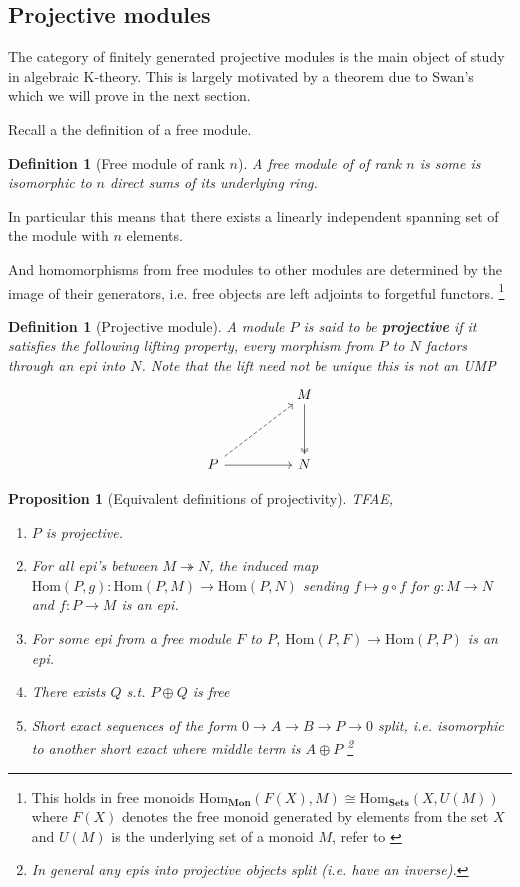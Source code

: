 \documentclass[12pt]{article}
\numberwithin{equation}{section}
\newcommand{\Hom}{{\mathrm{Hom}}}
\newcounter{dummy} \numberwithin{dummy}{section}
\newtheorem{definition}[dummy]{Definition}
\newtheorem{proposition}[dummy]{Proposition}
\begin{document}
	\subsection{Projective modules}	
	The category of finitely generated projective modules is the main object of study in algebraic K-theory. This is largely motivated by a theorem due to Swan's which we will prove in the next section.
	
	Recall a the definition of a free module.
	\begin{definition}[Free module of rank $n$]
		A free module of of rank $n$ is some is isomorphic to $n$ direct sums of its underlying ring. 
	\end{definition}In particular this means that there exists a linearly independent spanning set of the module with $n$ elements.
	
	And homomorphisms from free modules to other modules are determined by the image of their generators, i.e. free objects are left adjoints to forgetful functors. \footnote{This holds in free monoids $\mathrm{Hom}_\mathbf{Mon}(F(X), M) \cong \mathrm{Hom}_\mathbf{Sets} (X, U(M))$ where $F(X)$ denotes the free monoid generated by elements from the set $X$ and $U(M)$ is the underlying set of a monoid $M$, refer to \cite[p. ~208]{Awodey} }
	\begin{definition}[Projective module]
		A module $P$ is said to be \textbf{projective} if it satisfies the following lifting property, every morphism from $P$ to $N$ factors through an epi into $N$. Note that the lift need not be unique this is \textit{not} an UMP
		\[\begin{tikzcd}
			&& M \\
			\\
			P && N
			\arrow[two heads, from=1-3, to=3-3]
			\arrow[from=3-1, to=3-3]
			\arrow[dashed, from=3-1, to=1-3]
		\end{tikzcd}\]
	\end{definition}
	
	
	
	
	\begin{proposition}[Equivalent definitions of projectivity]\label{projtfae}
		TFAE,
		\begin{enumerate}
			\item $P$ is projective.
			\item For all epi's between $M\twoheadrightarrow N$, the induced map $\Hom(P,g):\mathrm{Hom}(P,M) \to \mathrm{Hom}(P,N)$ sending $f \mapsto g \circ f$ for $g:M \to N$ and $f:P \to M$ is an epi.
			\item For some epi from a free module $F$ to $P$, $\mathrm{Hom}(P,F) \to \mathrm{Hom}(P,P)$ is an epi.
			\item There exists $Q$ s.t. $P \oplus Q$ is free
			\item Short exact sequences of the form $0 \to A \to B \to P \to 0$ split, i.e. isomorphic to another short exact where middle term is $A \oplus P$ \footnote{In general any epis into projective objects split (i.e. have an inverse).}
		\end{enumerate}
	\end{proposition}
	
\end{document}
